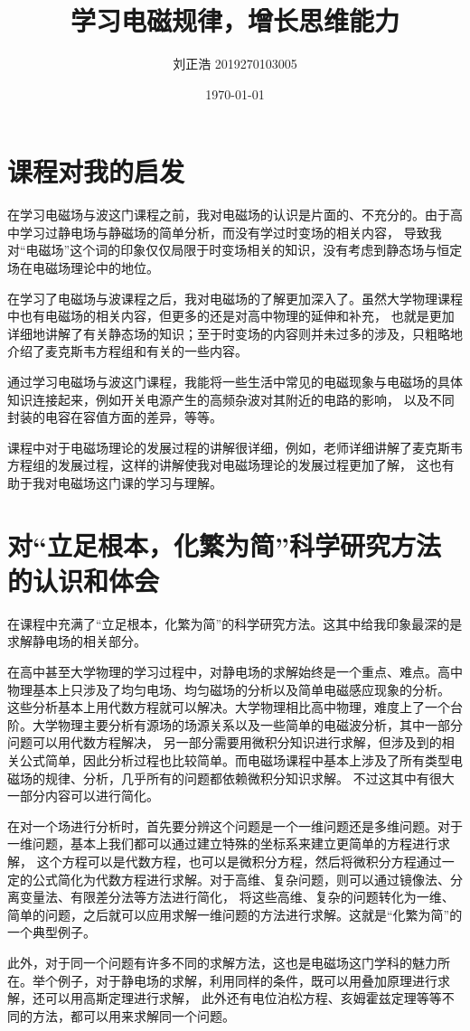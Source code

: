 \documentclass[a4paper]{article}
\title{\heiti\zihao{2} 学习电磁规律，增长思维能力}
\author{\songti 刘正浩 2019270103005}
\date{\today}
\begin{document}
	\maketitle
	\thispagestyle{empty}


	\tableofcontents

	\section{课程对我的启发}
		在学习电磁场与波这门课程之前，我对电磁场的认识是片面的、不充分的。由于高中学习过静电场与静磁场的简单分析，而没有学过时变场的相关内容，
		导致我对“电磁场”这个词的印象仅仅局限于时变场相关的知识，没有考虑到静态场与恒定场在电磁场理论中的地位。\par
		在学习了电磁场与波课程之后，我对电磁场的了解更加深入了。虽然大学物理课程中也有电磁场的相关内容，但更多的还是对高中物理的延伸和补充，
		也就是更加详细地讲解了有关静态场的知识；至于时变场的内容则并未过多的涉及，只粗略地介绍了麦克斯韦方程组和有关的一些内容。\par
		通过学习电磁场与波这门课程，我能将一些生活中常见的电磁现象与电磁场的具体知识连接起来，例如开关电源产生的高频杂波对其附近的电路的影响，
		以及不同封装的电容在容值方面的差异，等等。\par
		课程中对于电磁场理论的发展过程的讲解很详细，例如，老师详细讲解了麦克斯韦方程组的发展过程，这样的讲解使我对电磁场理论的发展过程更加了解，
		这也有助于我对电磁场这门课的学习与理解。
	\section{对“立足根本，化繁为简”科学研究方法的认识和体会}
		在课程中充满了“立足根本，化繁为简”的科学研究方法。这其中给我印象最深的是求解静电场的相关部分。\par
		在高中甚至大学物理的学习过程中，对静电场的求解始终是一个重点、难点。高中物理基本上只涉及了均匀电场、均匀磁场的分析以及简单电磁感应现象的分析。
		这些分析基本上用代数方程就可以解决。大学物理相比高中物理，难度上了一个台阶。大学物理主要分析有源场的场源关系以及一些简单的电磁波分析，其中一部分问题可以用代数方程解决，
		另一部分需要用微积分知识进行求解，但涉及到的相关公式简单，因此分析过程也比较简单。而电磁场课程中基本上涉及了所有类型电磁场的规律、分析，几乎所有的问题都依赖微积分知识求解。
		不过这其中有很大一部分内容可以进行简化。\par
		在对一个场进行分析时，首先要分辨这个问题是一个一维问题还是多维问题。对于一维问题，基本上我们都可以通过建立特殊的坐标系来建立更简单的方程进行求解，
		这个方程可以是代数方程，也可以是微积分方程，然后将微积分方程通过一定的公式简化为代数方程进行求解。对于高维、复杂问题，则可以通过镜像法、分离变量法、有限差分法等方法进行简化，
		将这些高维、复杂的问题转化为一维、简单的问题，之后就可以应用求解一维问题的方法进行求解。这就是“化繁为简”的一个典型例子。\par
		此外，对于同一个问题有许多不同的求解方法，这也是电磁场这门学科的魅力所在。举个例子，对于静电场的求解，利用同样的条件，既可以用叠加原理进行求解，还可以用高斯定理进行求解，
		此外还有电位泊松方程、亥姆霍兹定理等等不同的方法，都可以用来求解同一个问题。
\end{document}
